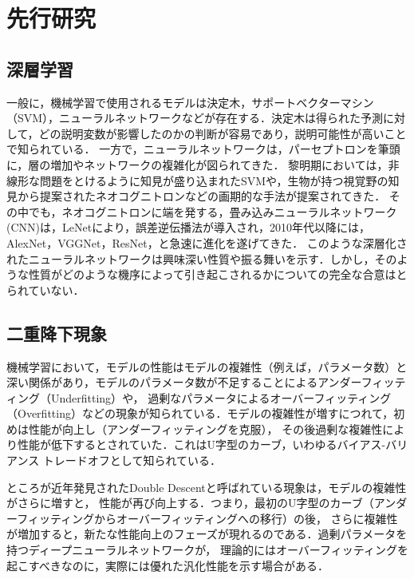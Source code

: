 \chapter{先行研究}
\section{深層学習}
一般に，機械学習で使用されるモデルは決定木，サポートベクターマシン（SVM），ニューラルネットワークなどが存在する．決定木は得られた予測に対して，どの説明変数が影響したのかの判断が容易であり，説明可能性が高いことで知られている．
一方で，ニューラルネットワークは，パーセプトロンを筆頭に，層の増加やネットワークの複雑化が図られてきた．
黎明期においては，非線形な問題をとけるように知見が盛り込まれたSVMや，生物が持つ視覚野の知見から提案されたネオコグニトロンなどの画期的な手法が提案されてきた．
その中でも，ネオコグニトロンに端を発する，畳み込みニューラルネットワーク(CNN)は，LeNet\cite{LeNet}により，誤差逆伝播法が導入され，2010年代以降には，AlexNet\cite{AlexNet}，VGGNet\cite{VGGNet}，ResNet\cite{ResNet}，と急速に進化を遂げてきた．
このような深層化されたニューラルネットワークは興味深い性質や振る舞いを示す．しかし，そのような性質がどのような機序によって引き起こされるかについての完全な合意はとられていない．

\newpage

\section{二重降下現象}
機械学習において，モデルの性能はモデルの複雑性（例えば，パラメータ数）と深い関係があり，モデルのパラメータ数が不足することによるアンダーフィッティング（Underfitting）\cite{underfitting}や，
過剰なパラメータによるオーバーフィッティング（Overfitting）\cite{overfitting}などの現象が知られている．モデルの複雑性が増すにつれて，初めは性能が向上し（アンダーフィッティングを克服），
その後過剰な複雑性により性能が低下するとされていた．これはU字型のカーブ，いわゆるバイアス-バリアンス トレードオフ\cite{Rajnarayan2010}として知られている．

ところが近年発見されたDouble Descent\cite{Belkin_2019}と呼ばれている現象は，モデルの複雑性がさらに増すと，
性能が再び向上する．つまり，最初のU字型のカーブ（アンダーフィッティングからオーバーフィッティングへの移行）の後，
さらに複雑性が増加すると，新たな性能向上のフェーズが現れるのである．過剰パラメータを持つディープニューラルネットワークが，
理論的にはオーバーフィッティングを起こすべきなのに，実際には優れた汎化性能を示す場合がある\cite{ResNet,ViT}．

